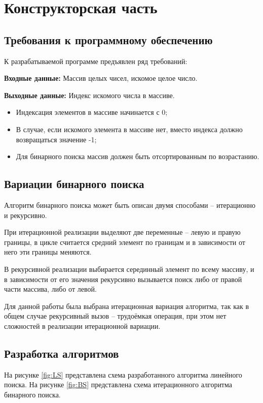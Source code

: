 \chapter{Конструкторская часть}

\section{Требования к программному обеспечению}

К разрабатываемой программе предъявлен ряд требований:

\textbf{Входные данные:} Массив целых чисел, искомое целое число.

\textbf{Выходные данные:} Индекс искомого числа в массиве.

\begin{itemize}
	\item Индексация элементов в массиве начинается с 0;
	\item В случае, если искомого элемента в массиве нет, вместо индекса должно возвращаться значение -1;
	\item Для бинарного поиска массив должен быть отсортированным по возрастанию.
\end{itemize}


\section{Вариации бинарного поиска}
Алгоритм бинарного поиска может быть описан двумя способами – итерационно и рекурсивно.

При итерационной реализации выделяют две переменные – левую и правую границы, в цикле считается средний элемент по границам и в зависимости от него эти границы меняются.

В рекурсивной реализации выбирается серединный элемент по всему массиву, и в зависимости от его значения рекурсивно вызывается поиск либо от правой части массива, либо от левой.

Для данной работы была выбрана итерационная вариация алгоритма, так как в общем случае рекурсивный вызов – трудоёмкая операция, при этом нет сложностей в реализации итерационной вариации.
\section{Разработка алгоритмов}
На рисунке \ref{fig:LS} представлена схема разработанного алгоритма линейного поиска. На рисунке \ref{fig:BS} представлена схема итерационного алгоритма бинарного поиска.


